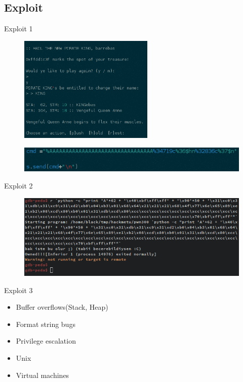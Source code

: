 \documentclass[compress]{beamer}
\begin{document}
\subsection{Exploit}

\begin{frame}{Exploit 1}
	\begin{figure}
		\centering
		\includegraphics[height=2in]{images/e11.png}
	\end{figure}
	\begin{figure}
		\centering
		\includegraphics[width=\textwidth,height=0.5in]{images/e12.png}
	\end{figure}    
\end{frame}

\begin{frame}{Exploit 2}
	\begin{figure}
		\centering
		\includegraphics[width=\textwidth]{images/e21.png}
	\end{figure}
\end{frame}

\begin{frame}{Exploit 3}

\begin{itemize}
	\item Buffer overflows(Stack, Heap)
    \item Format string bugs
    \item Privilege escalation
    \item Unix
    \item Virtual machines
\end{itemize}

\end{frame}
\end{document}
